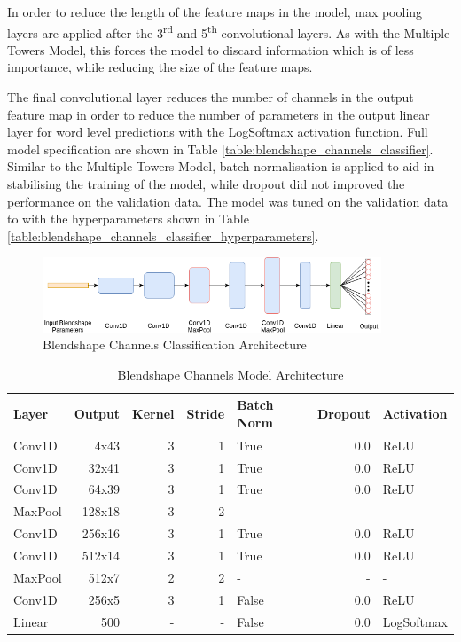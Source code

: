 In order to reduce the length of the feature maps in the model, max pooling layers are applied after the 3\textsuperscript{rd} and 5\textsuperscript{th} convolutional layers.
As with the Multiple Towers Model, this forces the model to discard information which is of less importance, while reducing the size of the feature maps.

The final convolutional layer reduces the number of channels in the output feature map in order to reduce the number of parameters in the output linear layer for word level predictions with the LogSoftmax activation function.
Full model specification are shown in Table \ref{table:blendshape_channels_classifier}.
Similar to the Multiple Towers Model, batch normalisation is applied to aid in stabilising the training of the model, while dropout did not improved the performance on the validation data.
The model was tuned on the validation data to with the hyperparameters shown in Table \ref{table:blendshape_channels_classifier_hyperparameters}.

\begin{figure}[h!]
    \centering
        \includegraphics[width=0.9\textwidth]{figures/classification/blendshape_channel_arch.png}
    \caption{Blendshape Channels Classification Architecture}
\end{figure} \label{fig:Blendshape_Channel_Classifier}
\quad

\begin{table}[h!]
\centering
    \begin{tabular}{ l | r | r | r | l | r | l}
    \textbf{Layer} & \textbf{Output} & \textbf{Kernel} & \textbf{Stride} & \textbf{Batch Norm} & \textbf{Dropout} & \textbf{Activation} \\ \hline
    Conv1D & 4x43 & 3 & 1 & True & 0.0 & ReLU \\ \hline
    Conv1D & 32x41 & 3 & 1 & True & 0.0 & ReLU \\ \hline
    Conv1D & 64x39 & 3 & 1 & True & 0.0 & ReLU \\ \hline
    MaxPool & 128x18 & 3 & 2 & - & - & - \\ \hline
    Conv1D & 256x16 & 3 & 1 & True & 0.0 & ReLU \\ \hline
    Conv1D & 512x14 & 3 & 1 & True & 0.0 & ReLU \\ \hline
    MaxPool & 512x7 & 2 & 2 & - & - & - \\ \hline
    Conv1D & 256x5 & 3 & 1 & False & 0.0 & ReLU \\ \hline
    Linear & 500 & - & - & False & 0.0 & LogSoftmax \\
    \end{tabular} 
    \caption{Blendshape Channels Model Architecture}
\end{table}\label{table:blendshape_channels_classifier}
\quad


